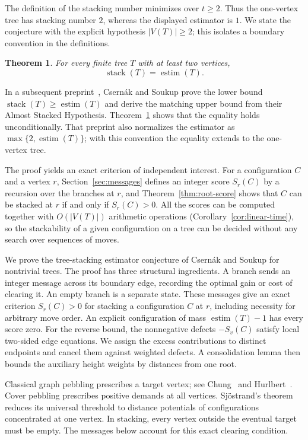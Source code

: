 \documentclass[11pt]{amsart}
\newtheorem{theorem}{Theorem}[section]
\theoremstyle{definition}
\theoremstyle{remark}
\DeclareMathOperator{\stack}{stack}
\DeclareMathOperator{\estim}{estim}
\begin{document}
The definition of the stacking number minimizes over $t\ge2$. Thus the
one-vertex tree has stacking number $2$, whereas the displayed estimator is
$1$. We state the conjecture with the explicit hypothesis $|V(T)|\ge2$;
this isolates a boundary convention in the definitions.

\begin{theorem}\label{thm:main}
For every finite tree $T$ with at least two vertices,
\[
 \stack(T)=\estim(T).
\]
\end{theorem}

In a subsequent preprint~\cite{cs2026ash}, Csern\'ak and Soukup prove the
lower bound $\stack(T)\ge\estim(T)$ and derive the matching upper bound from
their Almost Stacked Hypothesis. Theorem~\ref{thm:main} shows that the
equality holds unconditionally. That preprint also normalizes the estimator
as $\max\{2,\estim(T)\}$; with this convention the equality extends to the
one-vertex tree.

The proof yields an exact criterion of independent interest. For a
configuration $C$ and a vertex $r$, Section~\ref{sec:messages} defines an
integer score $S_r(C)$ by a recursion over the branches at $r$, and
Theorem~\ref{thm:root-score} shows that $C$ can be stacked at $r$ if and
only if $S_r(C)>0$. All the scores can be computed together with
$O(|V(T)|)$ arithmetic operations (Corollary~\ref{cor:linear-time}), so the
stackability of a given configuration on a tree can be decided without any
search over sequences of moves.

We prove the tree-stacking estimator conjecture of Csern\'ak and Soukup for
nontrivial trees. The proof has three structural ingredients.
A branch sends an integer message across its boundary edge, recording the
optimal gain or cost of clearing it. An empty branch is a separate state.
These messages give an exact criterion $S_r(C)>0$ for stacking a
configuration $C$ at $r$, including necessity for arbitrary move order.
An explicit configuration of mass $\estim(T)-1$ has every score zero.
For the reverse bound, the nonnegative defects $-S_v(C)$ satisfy local
two-sided edge equations. We assign the excess contributions to distinct
endpoints and cancel them against weighted defects. A consolidation lemma
then bounds the auxiliary height weights by distances from one root.

Classical graph pebbling prescribes a target vertex; see
Chung~\cite{chung1989} and Hurlbert~\cite{hurlbert1999}.
Cover pebbling prescribes positive demands at all vertices. Sj\"ostrand's
theorem~\cite{sjostrand2005} reduces its universal threshold to distance
potentials of configurations concentrated at one vertex.
In stacking, every vertex outside the eventual target must be empty.
The messages below account for this exact clearing condition.
\end{document}
